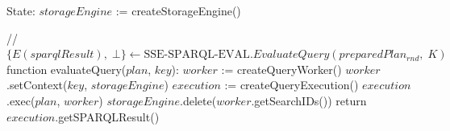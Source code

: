 State:
    $storageEngine$ := createStorageEngine()

// $\{E(sparqlResult), \; \bot\} \leftarrow \textrm{SSE-SPARQL-EVAL}.EvaluateQuery(preparedPlan_{rnd}, \; K)$
function evaluateQuery($plan$, \; $key$):
    $worker$ := createQueryWorker()
    $worker$.setContext($key$, $storageEngine$)
    $execution$ := createQueryExecution()
    $execution$.exec($plan$, $worker$)
    $storageEngine$.delete($worker$.getSearchIDs())
    return $execution$.getSPARQLResult()